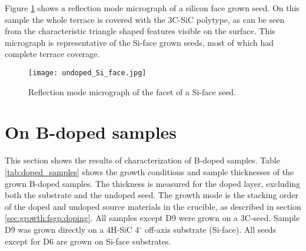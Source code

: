 Figure \ref{fig:silicon_seed} shows a reflection mode micrograph of a silicon face grown seed. On this sample the whole terrace is covered with the 3C-SiC polytype, as can be seen from the characteristic triangle shaped features visible on the surface. This micrograph is representative of the Si-face grown seeds, most of which had complete terrace coverage. 

\begin{figure}[H]
\begin{center}
\texttt{[image: undoped\_Si\_face.jpg]}
\caption{Reflection mode micrograph of the facet of a Si-face seed.
\label{fig:silicon_seed}}
\end{center}
\end{figure}




\section{On B-doped samples}
\label{sec:results:doped}
This section shows the results of characterization of B-doped samples. Table \ref{tab:doped_samples} shows the growth conditions and sample thicknesses of the grown B-doped samples. The thickness is measured for the doped layer, excluding both the substrate and the undoped seed. The growth mode is the stacking order of the doped and undoped source materials in the crucible, as described in section \ref{sec:growth:fsgp:doping}. All samples except D9 were grown on a 3C-seed. Sample D9 was grown directly on a 4H-SiC 4$^\circ$ off-axis substrate (Si-face). All seeds except for D6 are grown on Si-face substrates. 



